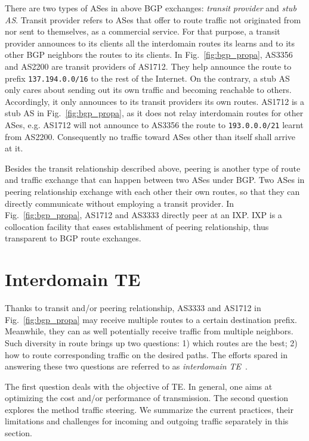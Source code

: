 There are two types of ASes in above BGP exchanges: \textit{transit provider} and \textit{stub AS}.
Transit provider refers to ASes that offer to route traffic not originated from nor sent to themselves, as a commercial service.
For that purpose, a transit provider announces to its clients all the interdomain routes its learns and to its other BGP neighbors the routes to its clients.
In Fig.~\ref{fig:bgp_propa}, AS3356 and AS2200 are transit providers of AS1712. They help announce the route to prefix \texttt{137.194.0.0/16}
to the rest of the Internet.
On the contrary, a stub AS only cares about sending out its own traffic and becoming reachable to others.
Accordingly, it only announces to its transit providers its own routes. AS1712 is a stub AS in Fig.~\ref{fig:bgp_propa}, as it does not relay interdomain routes for other ASes, e.g. AS1712 will not announce to AS3356 the route to \texttt{193.0.0.0/21} learnt from AS2200. Consequently no traffic toward ASes other than itself shall arrive at it.

Besides the transit relationship described above, peering is another type of route and traffic exchange that can happen between two ASes under BGP. Two ASes in peering relationship exchange with each other their own routes, so that they can directly communicate without employing a transit provider.
In Fig.~\ref{fig:bgp_propa}, AS1712 and AS3333 directly peer at an \ac{IXP}.
\ac{IXP} is a collocation facility that eases establishment of peering relationship, thus transparent to BGP route exchanges.

\section{Interdomain TE}
Thanks to transit and/or peering relationship, AS3333 and AS1712 in Fig.~\ref{fig:bgp_propa} may receive multiple routes to a certain destination prefix. Meanwhile, they can as well potentially receive traffic from multiple neighbors.
Such diversity in route brings up two questions: 1) which routes are the best; 2) how to route corresponding traffic on the desired paths.
The efforts spared in answering these two questions are referred to as \textit{interdomain \ac{TE}}~\cite{Quoitin2004a,Quoitin2003,Feamster2003}.

The first question deals with the objective of \ac{TE}. In general, one aims at optimizing the cost and/or performance of transmission.
The second question explores the method traffic steering.
We summarize the current practices, their limitations and challenges for incoming and outgoing traffic separately in this section.

